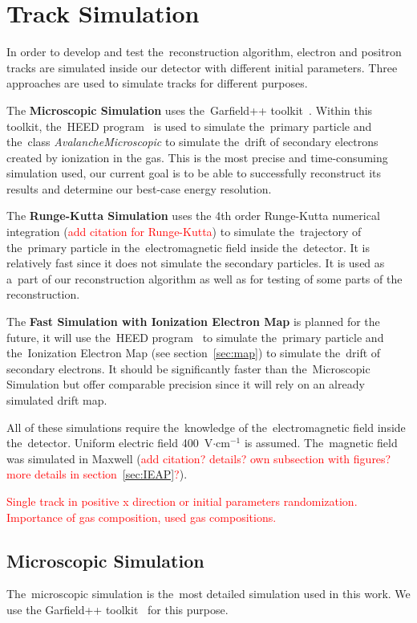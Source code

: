 \chapter{Track Simulation}
	In order to develop and test the~reconstruction algorithm, electron and positron tracks are simulated inside our detector with different initial parameters. Three approaches are used to simulate tracks for different purposes.
	
	The \textbf{Microscopic Simulation} uses the~Garfield++ toolkit~\cite{Garfield++}. Within this toolkit, the~\ac{HEED} program~\cite{HEED} is used to simulate the~primary particle and the~class \textit{AvalancheMicroscopic} to simulate the~drift of secondary electrons created by ionization in the gas. This is the most precise and time-consuming simulation used, our current goal is to be able to successfully reconstruct its results and determine our best-case energy resolution.
	
	The \textbf{Runge-Kutta Simulation} uses the 4th order Runge-Kutta numerical integration (\textcolor{red}{add citation for Runge-Kutta}) to simulate the~trajectory of the~primary particle in the~electromagnetic field inside the~detector. It is relatively fast since it does not simulate the secondary particles. It is used as a~part of our reconstruction algorithm as well as for testing of some parts of the reconstruction.
	
	The \textbf{Fast Simulation with Ionization Electron Map} is planned for the future, it will use the~\ac{HEED} program~\cite{HEED} to simulate the~primary particle and the~Ionization Electron Map (see section~\ref{sec:map}) to simulate the~drift of secondary electrons. It should be significantly faster than the~Microscopic Simulation but offer comparable precision since it will rely on an already simulated drift map.
	
	All of these simulations require the~knowledge of the~electromagnetic field inside the~detector. Uniform electric field 400~V$\cdot$cm$^{-1}$ is assumed. The~magnetic field was simulated in Maxwell (\textcolor{red}{add citation? details? own subsection with figures? more details in section~\ref{sec:IEAP}?}).
	
	\textcolor{red}{Single track in positive x direction or initial parameters randomization. Importance of gas composition, used gas compositions.}
	
	\section{Microscopic Simulation}
	\label{sec:microsim}
		The~microscopic simulation is the~most detailed simulation used in this work. We use the Garfield++ toolkit~\cite{Garfield++} for this purpose. 
		

